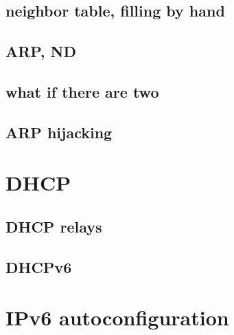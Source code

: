 \subsection{neighbor table, filling by hand}


\subsection{ARP, ND}



\subsection{what if there are two}



\subsection{ARP hijacking}




\section{DHCP}


\subsection{DHCP relays}


\subsection{DHCPv6}


\section{IPv6 autoconfiguration}


